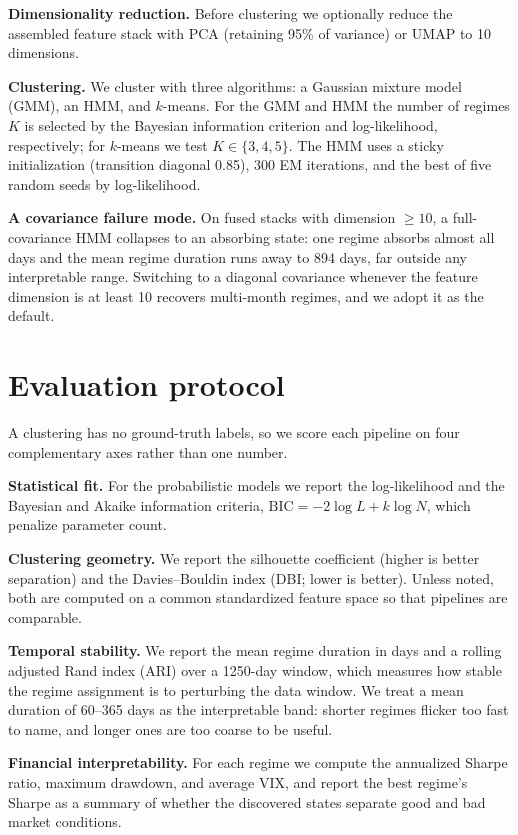 \documentclass{article} %
\begin{document}
\textbf{Dimensionality reduction.} Before clustering we optionally reduce the
assembled feature stack with PCA (retaining 95\% of variance) or UMAP
\citep{mcinnes2018} to 10 dimensions.

\textbf{Clustering.} We cluster with three algorithms: a Gaussian mixture model
(GMM), an HMM, and $k$-means. For the GMM and HMM the number of regimes $K$ is
selected by the Bayesian information criterion and log-likelihood,
respectively; for $k$-means we test $K\in\{3,4,5\}$. The HMM uses a sticky
initialization (transition diagonal 0.85), 300 EM iterations, and the best of
five random seeds by log-likelihood.

\textbf{A covariance failure mode.} On fused stacks with dimension $\geq 10$, a
full-covariance HMM collapses to an absorbing state: one regime absorbs almost
all days and the mean regime duration runs away to 894 days, far outside any
interpretable range. Switching to a diagonal covariance whenever the feature
dimension is at least 10 recovers multi-month regimes, and we adopt it as the
default.

\section{Evaluation protocol}
\label{sec:eval}

A clustering has no ground-truth labels, so we score each pipeline on four
complementary axes rather than one number.

\textbf{Statistical fit.} For the probabilistic models we report the
log-likelihood and the Bayesian and Akaike information criteria,
$\mathrm{BIC} = -2\log L + k\log N$, which penalize parameter count.

\textbf{Clustering geometry.} We report the silhouette coefficient
\citep{rousseeuw1987} (higher is better separation) and the Davies--Bouldin
index \citep{davies1979} (DBI; lower is better). Unless noted, both are computed
on a common standardized feature space so that pipelines are comparable.

\textbf{Temporal stability.} We report the mean regime duration in days and a
rolling adjusted Rand index (ARI) over a 1250-day window, which measures how
stable the regime assignment is to perturbing the data window. We treat a mean
duration of 60--365 days as the interpretable band: shorter regimes flicker too
fast to name, and longer ones are too coarse to be useful.

\textbf{Financial interpretability.} For each regime we compute the annualized
Sharpe ratio, maximum drawdown, and average VIX, and report the best regime's
Sharpe as a summary of whether the discovered states separate good and bad
market conditions.
\end{document}
